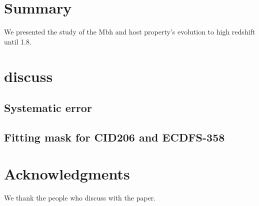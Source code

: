 \documentclass[apj]{emulateapj}
\begin{document}
\section{Summary}
\label{sec:sum}
We presented the study of the Mbh and host property's evolution to high redshift until 1.8.

\section{discuss}
\label{sec:dis}
\subsection{Systematic error}
\subsection{Fitting mask for CID206 and ECDFS-358}

\section*{Acknowledgments}
We thank the people who discuss with the paper.



\end{document}
